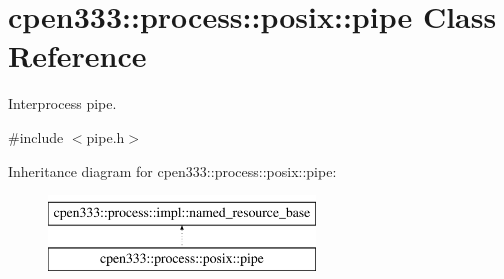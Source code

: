 \hypertarget{classcpen333_1_1process_1_1posix_1_1pipe}{}\section{cpen333\+:\+:process\+:\+:posix\+:\+:pipe Class Reference}
\label{classcpen333_1_1process_1_1posix_1_1pipe}


Interprocess pipe.  




{\ttfamily \#include $<$pipe.\+h$>$}

Inheritance diagram for cpen333\+:\+:process\+:\+:posix\+:\+:pipe\+:\begin{figure}[H]
\begin{center}
\leavevmode
\includegraphics[height=2.000000cm]{classcpen333_1_1process_1_1posix_1_1pipe}
\end{center}
\end{figure}
